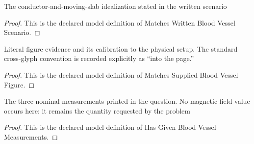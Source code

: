 \begin{definition}
  \label{def:physics:phyx-mini-0972:phyxminiproblems-problemphyxmini0972-matcheswrittenbloodvesselscenario}
  The conductor-and-moving-slab idealization stated in the written scenario
\end{definition}
\begin{proof}
  This is the declared model definition of Matches Written Blood Vessel Scenario.
\end{proof}
\begin{definition}
  \label{def:physics:phyx-mini-0972:phyxminiproblems-problemphyxmini0972-matchessuppliedbloodvesselfigure}
  Literal figure evidence and its calibration to the physical setup. The standard cross-glyph convention is recorded explicitly as “into the page.”
\end{definition}
\begin{proof}
  This is the declared model definition of Matches Supplied Blood Vessel Figure.
\end{proof}
\begin{definition}
  \label{def:physics:phyx-mini-0972:phyxminiproblems-problemphyxmini0972-hasgivenbloodvesselmeasurements}
  The three nominal measurements printed in the question. No magnetic-field value occurs here: it remains the quantity requested by the problem
\end{definition}
\begin{proof}
  This is the declared model definition of Has Given Blood Vessel Measurements.
\end{proof}
